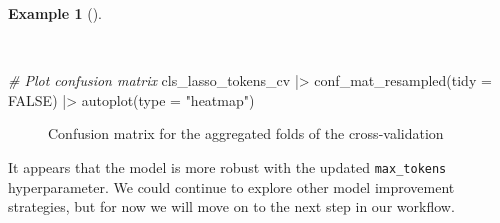 \documentclass[
  letterpaper,
  krantz1]{latex/krantz-mod}
\newenvironment{Shaded}{\begin{snugshade}}{\end{snugshade}}
\newcommand{\AttributeTok}[1]{\textcolor[rgb]{0.00,0.00,0.00}{#1}}
\newcommand{\CommentTok}[1]{\textcolor[rgb]{0.00,0.00,0.00}{\textit{#1}}}
\newcommand{\ConstantTok}[1]{\textcolor[rgb]{0.00,0.00,0.00}{#1}}
\newcommand{\FunctionTok}[1]{\textcolor[rgb]{0.00,0.00,0.00}{#1}}
\newcommand{\NormalTok}[1]{\textcolor[rgb]{0.00,0.00,0.00}{#1}}
\newcommand{\SpecialCharTok}[1]{\textcolor[rgb]{0.00,0.00,0.00}{#1}}
\newcommand{\StringTok}[1]{\textcolor[rgb]{0.00,0.00,0.00}{#1}}
\theoremstyle{definition}
\newtheorem{example}{Example}[chapter]
\theoremstyle{definition}
\theoremstyle{remark}
\begin{document}
\begin{example}[]\protect\hypertarget{exm-predict-class-tune-hyperparameters-tokenfilter-evaluate-workflow-cv-confusion}{}\label{exm-predict-class-tune-hyperparameters-tokenfilter-evaluate-workflow-cv-confusion}

~

\begin{Shaded}
\begin{Highlighting}[numbers=left,,]
\CommentTok{\# Plot confusion matrix}
\NormalTok{cls\_lasso\_tokens\_cv }\SpecialCharTok{|\textgreater{}}
  \FunctionTok{conf\_mat\_resampled}\NormalTok{(}\AttributeTok{tidy =} \ConstantTok{FALSE}\NormalTok{) }\SpecialCharTok{|\textgreater{}}
  \FunctionTok{autoplot}\NormalTok{(}\AttributeTok{type =} \StringTok{"heatmap"}\NormalTok{)}
\end{Highlighting}
\end{Shaded}

\end{example}

\begin{figure}[!htb]


\caption{\label{fig-predict-class-tune-hyperparameters-tokenfilter-evaluate-workflow-cv-confusion}Confusion
matrix for the aggregated folds of the cross-validation}

\end{figure}%

It appears that the model is more robust with the updated
\texttt{max\_tokens} hyperparameter. We could continue to explore other
model improvement strategies, but for now we will move on to the next
step in our workflow.
\end{document}
